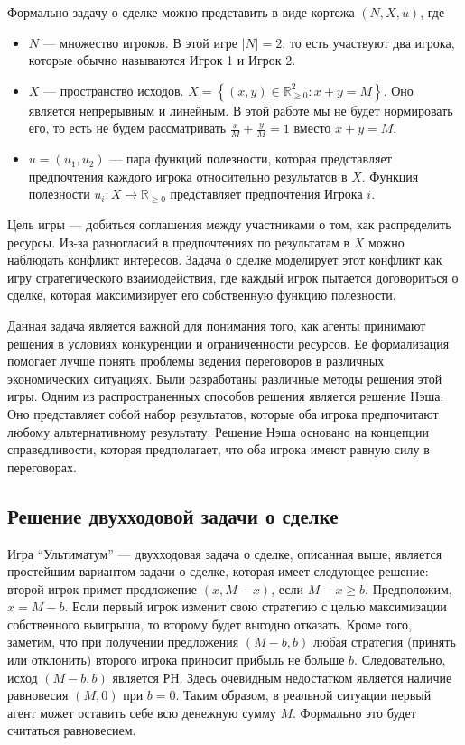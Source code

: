 Формально задачу о сделке можно представить в виде кортежа $(N, X, u)$, где

\begin{itemize}

\item $N$ --- множество игроков. В этой игре $|N| = 2$, то есть участвуют два игрока, которые обычно называются Игрок 1 и Игрок 2.

\item $X$ --- пространство исходов. $X = \left\{ (x, y) \in \mathbb{R}_{\geq 0}^2: x + y = M \right\}$. Оно является непрерывным и линейным. В этой работе мы не будет нормировать его, то есть не будем рассматривать $\frac{x}{M} + \frac{y}{M} = 1$ вместо $x + y = M$.

\item $u = (u_1, u_2)$ --- пара функций полезности, которая представляет предпочтения каждого игрока относительно результатов в $X$. Функция полезности $u_i: X \rightarrow \mathbb{R}_{\geq 0}$ представляет предпочтения Игрока $i$.

\end{itemize}

Цель игры --- добиться соглашения между участниками о том, как распределить ресурсы. Из-за разногласий в предпочтениях по результатам в $X$ можно наблюдать конфликт интересов. Задача о сделке моделирует этот конфликт как игру стратегического взаимодействия, где каждый игрок пытается договориться о сделке, которая максимизирует его собственную функцию полезности.

Данная задача является важной для понимания того, как агенты принимают решения в условиях конкуренции и ограниченности ресурсов. Ее формализация помогает лучше понять проблемы ведения переговоров в различных экономических ситуациях. Были разработаны различные методы решения этой игры. Одним из распространенных способов решения является решение Нэша. Оно представляет собой набор результатов, которые оба игрока предпочитают любому альтернативному результату. Решение Нэша основано на концепции справедливости, которая предполагает, что оба игрока имеют равную силу в переговорах.\\


\subsection{Решение двухходовой задачи о сделке}

Игра \enquote{Ультиматум} --- двухходовая задача о сделке, описанная выше, является простейшим вариантом задачи о сделке, которая имеет следующее решение: второй игрок примет предложение $(x, M - x)$, если $ M - x \geq b $. Предположим, $ x = M - b $. Если первый игрок изменит свою стратегию с целью максимизации собственного выигрыша, то второму будет выгодно отказать. Кроме того, заметим, что при получении предложения $(M - b, b)$ любая стратегия (принять или отклонить) второго игрока приносит прибыль не больше $b$. Следовательно, исход $(M - b, b)$ является РН. Здесь очевидным недостатком является наличие равновесия $(M, 0)$ при $b = 0$. Таким образом, в реальной ситуации первый агент может оставить себе всю денежную сумму $M$. Формально это будет считаться равновесием. 


